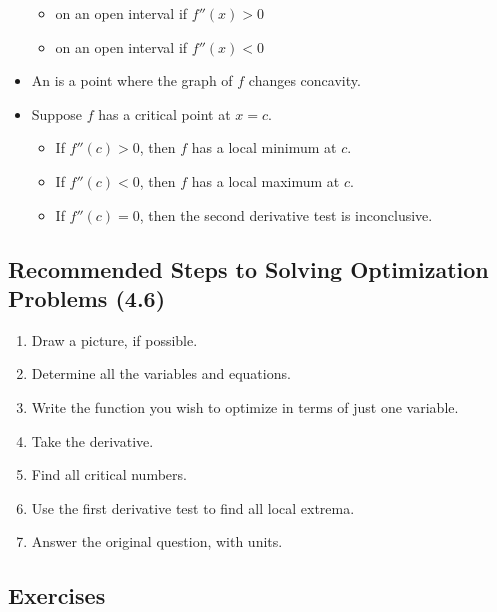 \begin{itemize}
\begin{itemize}
            \item {} on an open interval if $f''(x)>0$
            \item {} on an open interval if $f''(x)<0$
        \end{itemize}
		\item An  is a point where the graph of $f$ changes concavity.
        \item {} Suppose $f$ has a critical point at $x=c$.
        \begin{itemize}
            \item If $f''(c) > 0$, then $f$ has a local minimum at $c$.
            \item If $f''(c) < 0$, then $f$ has a local maximum at $c$.
            \item If $f''(c) = 0$, then the second derivative test is inconclusive.
        \end{itemize}
    \end{itemize}

\subsection*{Recommended Steps to Solving Optimization Problems (4.6)}

    \begin{enumerate}
        \item Draw a picture, if possible.
        \item Determine all the variables and equations.
        \item Write the function you wish to optimize in terms of just one variable.
        \item Take the derivative.
        \item Find all critical numbers.
        \item Use the first derivative test to find all local extrema.
        \item Answer the original question, with units. 
    \end{enumerate}


    
\subsection*{Exercises}

